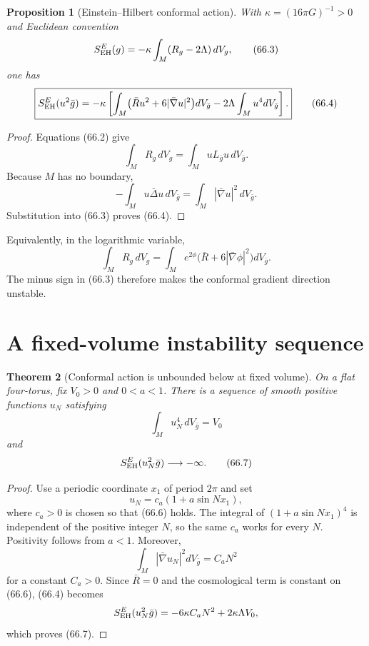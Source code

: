 \documentclass[11pt]{article}
\newtheorem{theorem}{Theorem}[section]
\newtheorem{proposition}[theorem]{Proposition}
\theoremstyle{remark}
\begin{document}
\begin{proposition}[Einstein--Hilbert conformal action]
\label{prop:v15v66-eh}
With \(\kappa=(16\pi G)^{-1}>0\) and Euclidean convention
\[
 S_{\rm EH}^{E}(g)
 =
 -\kappa\int_M(R_g-2\Lambda)\,dV_g,                   \tag{66.3}
\]
one has
\[
 \boxed{
 S_{\rm EH}^{E}(u^2\bar g)
 =
 -\kappa\left[
 \int_M\bigl(\bar Ru^2+6|\bar\nabla u|^2\bigr)
 dV_{\bar g}
 -2\Lambda\int_Mu^4dV_{\bar g}
 \right].}                                            \tag{66.4}
\]
\end{proposition}

\begin{proof}
Equations (66.2) give
\[
 \int_MR_g\,dV_g
 =
 \int_MuL_{\bar g}u\,dV_{\bar g}.
\]
Because \(M\) has no boundary,
\[
 -\int_Mu\bar\Delta u\,dV_{\bar g}
 =
 \int_M|\bar\nabla u|^2\,dV_{\bar g}.
\]
Substitution into (66.3) proves (66.4).
\end{proof}

Equivalently, in the logarithmic variable,
\[
 \int_MR_g\,dV_g
 =
 \int_Me^{2\phi}
 \bigl(\bar R+6|\bar\nabla\phi|^2\bigr)dV_{\bar g}.
                                                               \tag{66.5}
\]
The minus sign in (66.3) therefore makes the conformal gradient
direction unstable.

\section{A fixed-volume instability sequence}

\begin{theorem}[Conformal action is unbounded below at fixed volume]
\label{thm:v15v66-instability}
On a flat four-torus, fix \(V_0>0\) and \(0<a<1\).  There is a
sequence of smooth positive functions \(u_N\) satisfying
\[
 \int_Mu_N^4\,dV_{\bar g}=V_0                           \tag{66.6}
\]
and
\[
 S_{\rm EH}^{E}(u_N^2\bar g)\longrightarrow-\infty.   \tag{66.7}
\]
\end{theorem}

\begin{proof}
Use a periodic coordinate \(x_1\) of period \(2\pi\) and set
\[
 u_N=c_a(1+a\sin Nx_1),                               \tag{66.8}
\]
where \(c_a>0\) is chosen so that (66.6) holds.  The integral of
\((1+a\sin Nx_1)^4\) is independent of the positive integer \(N\),
so the same \(c_a\) works for every \(N\).  Positivity follows from
\(a<1\).  Moreover,
\[
 \int_M|\bar\nabla u_N|^2dV_{\bar g}
 =
 C_aN^2                                                   \tag{66.9}
\]
for a constant \(C_a>0\).  Since \(\bar R=0\) and the cosmological
term is constant on (66.6), (66.4) becomes
\[
 S_{\rm EH}^{E}(u_N^2\bar g)
 =
 -6\kappa C_aN^2+2\kappa\Lambda V_0,
\]
which proves (66.7).
\end{proof}
\end{document}
